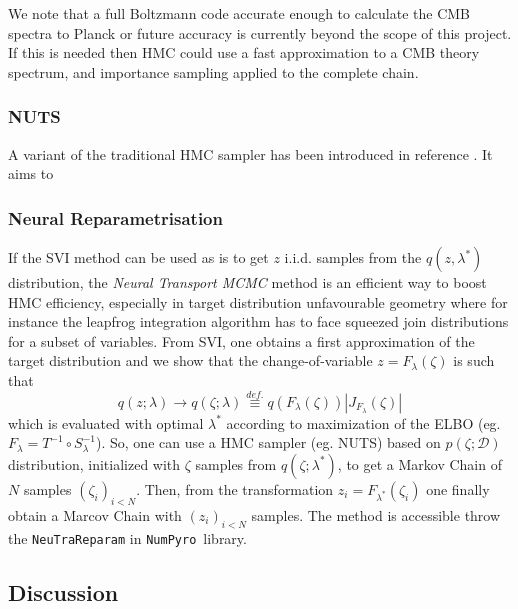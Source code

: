 \documentclass[final,5p,times,twocolumn,authoryear]{elsarticle}
\newcommand{\numpyro}{\texttt{NumPyro}}
\newcommand{\bydef}{\overset{def.}{\equiv}}
\begin{document}
We note that a full Boltzmann code accurate enough to calculate the CMB spectra to Planck \citep{planck18}
or future \citep{s4,simons} accuracy is currently beyond the scope of this project.  
If this is needed then HMC could use a fast approximation to a CMB theory spectrum, and importance sampling applied to the complete chain.

\subsubsection{NUTS}
%

A variant of the traditional HMC sampler has been introduced in reference \citep{nuts}. It aims to 


\subsubsection{Neural Reparametrisation}
If the SVI method can be used as is to get $z$ i.i.d. samples from the $q(z,\lambda^\ast)$ distribution, the \textit{Neural Transport MCMC} method \citep{2014arXiv1412.5492P,2019arXiv190303704H} is an efficient way to boost HMC efficiency, especially in target distribution unfavourable geometry where for instance the leapfrog integration algorithm has to face squeezed join distributions for a subset of variables. From SVI, one obtains a first approximation of the target distribution and we show that the change-of-variable $z=F_\lambda(\zeta)$ is such that
\begin{equation}
q(z;\lambda) \rightarrow q(\zeta;\lambda) \bydef q(F_\lambda(\zeta)) |J_{F_\lambda}(\zeta)|
\end{equation}
which is evaluated with optimal $\lambda^\ast$ according to maximization of the ELBO (eg. $F_\lambda=T^{-1}\circ S^{-1}_\lambda$). So, one can use a HMC sampler (eg. NUTS) based on $p(\zeta;\mathcal{D})$ distribution, initialized with $\zeta$ samples from $q(\zeta;\lambda^\ast)$, to get a Markov Chain of $N$ samples $(\zeta_i)_{i<N}$. Then, from the transformation  $z_i=F_{\lambda^\ast}(\zeta_i)$ one finally obtain a Marcov Chain with $(z_i)_{i<N}$ samples. The method is accessible throw the \verb|NeuTraReparam| in \numpyro\ library.


\subsection{Discussion}
\end{document}
